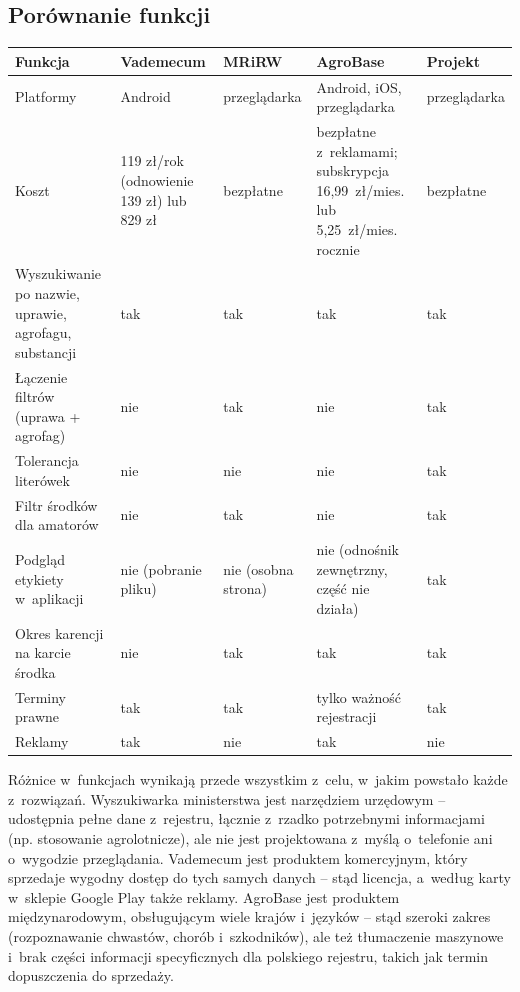 \subsection{Porównanie funkcji}

\begin{center}
\footnotesize
\begin{tabular}{|p{3.5cm}|p{2.8cm}|p{2.8cm}|p{2.5cm}|p{1.9cm}|}
\hline
\textbf{Funkcja} & \textbf{Vademecum} & \textbf{MRiRW} & \textbf{AgroBase} & \textbf{Projekt} \\
\hline
Platformy & Android & przeglądarka & Android, iOS, przeglądarka & przeglądarka \\
\hline
Koszt & 119 zł/rok (odnowienie 139 zł) lub 829 zł & bezpłatne & bezpłatne z~reklamami; subskrypcja 16,99~zł/mies. lub 5,25~zł/mies. rocznie & bezpłatne \\
\hline
Wyszukiwanie po nazwie, uprawie, agrofagu, substancji & tak & tak & tak & tak \\
\hline
Łączenie filtrów (uprawa + agrofag) & nie & tak & nie & tak \\
\hline
Tolerancja literówek & nie & nie & nie & tak \\
\hline
Filtr środków dla amatorów & nie & tak & nie & tak \\
\hline
Podgląd etykiety w~aplikacji & nie (pobranie pliku) & nie (osobna strona) & nie (odnośnik zewnętrzny, część nie działa) & tak \\
\hline
Okres karencji na karcie środka & nie & tak & tak & tak \\
\hline
Terminy prawne & tak & tak & tylko ważność rejestracji & tak \\
\hline
Reklamy & tak & nie & tak & nie \\
\hline
\end{tabular}
\end{center}

Różnice w~funkcjach wynikają przede wszystkim z~celu, w~jakim powstało każde
z~rozwiązań. Wyszukiwarka ministerstwa jest narzędziem urzędowym -- udostępnia
pełne dane z~rejestru, łącznie z~rzadko potrzebnymi informacjami (np.
stosowanie agrolotnicze), ale nie jest projektowana z~myślą o~telefonie ani
o~wygodzie przeglądania. Vademecum jest produktem komercyjnym, który sprzedaje
wygodny dostęp do tych samych danych -- stąd licencja, a~według karty
w~sklepie Google Play także reklamy. AgroBase jest produktem
międzynarodowym, obsługującym wiele krajów i~języków -- stąd szeroki zakres
(rozpoznawanie chwastów, chorób i~szkodników), ale też tłumaczenie maszynowe
i~brak części informacji specyficznych dla polskiego rejestru, takich jak
termin dopuszczenia do sprzedaży.

